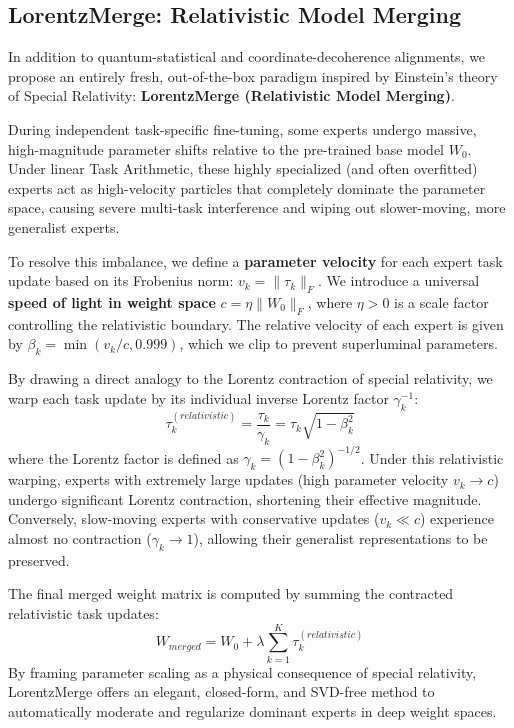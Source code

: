 \documentclass{article}
\theoremstyle{plain}
\theoremstyle{definition}
\theoremstyle{remark}
\begin{document}
\subsection{LorentzMerge: Relativistic Model Merging}
In addition to quantum-statistical and coordinate-decoherence alignments, we propose an entirely fresh, out-of-the-box paradigm inspired by Einstein's theory of Special Relativity: \textbf{LorentzMerge (Relativistic Model Merging)}. 

During independent task-specific fine-tuning, some experts undergo massive, high-magnitude parameter shifts relative to the pre-trained base model $W_0$. Under linear Task Arithmetic, these highly specialized (and often overfitted) experts act as high-velocity particles that completely dominate the parameter space, causing severe multi-task interference and wiping out slower-moving, more generalist experts. 

To resolve this imbalance, we define a \textbf{parameter velocity} for each expert task update based on its Frobenius norm: $v_k = \|\tau_k\|_F$. We introduce a universal \textbf{speed of light in weight space} $c = \eta \|W_0\|_F$, where $\eta > 0$ is a scale factor controlling the relativistic boundary. The relative velocity of each expert is given by $\beta_k = \min(v_k / c, 0.999)$, which we clip to prevent superluminal parameters.

By drawing a direct analogy to the Lorentz contraction of special relativity, we warp each task update by its individual inverse Lorentz factor $\gamma_k^{-1}$:
\begin{equation}
    \tau_k^{(relativistic)} = \frac{\tau_k}{\gamma_k} = \tau_k \sqrt{1 - \beta_k^2}
\end{equation}
where the Lorentz factor is defined as $\gamma_k = (1 - \beta_k^2)^{-1/2}$. Under this relativistic warping, experts with extremely large updates (high parameter velocity $v_k \to c$) undergo significant Lorentz contraction, shortening their effective magnitude. Conversely, slow-moving experts with conservative updates ($v_k \ll c$) experience almost no contraction ($\gamma_k \to 1$), allowing their generalist representations to be preserved. 

The final merged weight matrix is computed by summing the contracted relativistic task updates:
\begin{equation}
    W_{merged} = W_0 + \lambda \sum_{k=1}^K \tau_k^{(relativistic)}
\end{equation}
By framing parameter scaling as a physical consequence of special relativity, LorentzMerge offers an elegant, closed-form, and SVD-free method to automatically moderate and regularize dominant experts in deep weight spaces.
\end{document}
